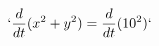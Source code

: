 \documentclass[preview]{standalone}
\begin{document}
\begin{align*}
`\frac{d}{dt}(x^2 + y^2) = \frac{d}{dt}(10^2)`
\end{align*}
\end{document}
